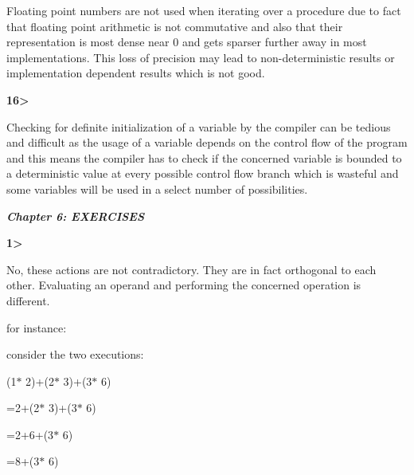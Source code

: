 \documentclass[12pt]{article}
\renewcommand{\_}{\kern-1.5pt\textunderscore\kern-1.5pt}
\begin{document}
Floating point numbers are not used when iterating over a procedure due to fact that floating point arithmetic is not commutative and also that their representation is most dense near 0 and gets sparser further away in most implementations. This loss of precision may lead to non-deterministic results or implementation dependent results which is not good.\par


\vspace{\baselineskip}
\textbf{16>}\par

Checking for definite initialization of a variable by the compiler can be tedious and difficult as the usage of a variable depends on the control flow of the program and this means the compiler has to check if the concerned variable is bounded to a deterministic value at every possible control flow branch which is wasteful and some variables will be used in a select number of possibilities.\par




\newpage

\vspace{\baselineskip}\textbf{\textit{Chapter 6: EXERCISES}}\par


\vspace{\baselineskip}
\textbf{1>}\par

No, these actions are not contradictory. They are in fact orthogonal to each other. Evaluating an operand and performing the concerned operation is different.\par


\vspace{\baselineskip}
for instance:\par

consider the two executions:\par


\vspace{\baselineskip}
(1$\ast$ 2)+(2$\ast$ 3)+(3$\ast$ 6)\par

=2+(2$\ast$ 3)+(3$\ast$ 6)\par

=2+6+(3$\ast$ 6)\par

=8+(3$\ast$ 6)\par
\end{document}
